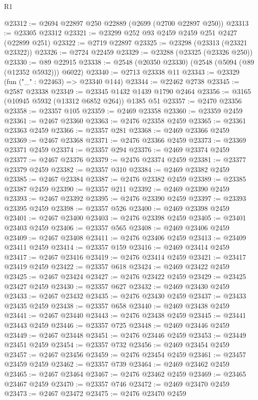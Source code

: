 \begin{lexlean}{R1}
\begin{coremodule}
@23312 := @2694 @22897 @250 @22889 (@2699 (@2700 @22897 @250))
@23313 := @23305 @23312
@23321 := @23299 @252 @93 @2459 @2459 @251 @2427 (@22899 @251)
@23322 := @2719 @22897
@23325 := @23298 (@23313 (@23321 @23322))
@23326 := @2724 @22459
@23329 := @23288 (@23325 (@23326 @250))
@23330 := @89 @22915
@23338 := @2548 (@20350 @23330) (@2548 (@5094 (@89 (@12352 @5932))) @6022)
@23340 := @2713 @23338 @11
@23343 := @23329 (fun ("_" : @22463) => @23340 @144)
@23344 := @22462 @2738
@23345 := @2587 @23338
@23349 := @23345 @1432 @1439 @1790 @2464
@23356 := @3165 (@10945 @5932 (@13312 @6852 @264)) @1385 @51
@23357 := @2470 @23356
@23358 := @23357 @105
@23359 := @2469 @23358
@23360 := @23359 @2459
@23361 := @2467 @23360
@23363 := @2476 @23358 @2459
@23365 := @23361 @23363 @2459
@23366 := @23357 @281
@23368 := @2469 @23366 @2459
@23369 := @2467 @23368
@23371 := @2476 @23366 @2459
@23373 := @23369 @23371 @2459
@23374 := @23357 @294
@23376 := @2469 @23374 @2459
@23377 := @2467 @23376
@23379 := @2476 @23374 @2459
@23381 := @23377 @23379 @2459
@23382 := @23357 @310
@23384 := @2469 @23382 @2459
@23385 := @2467 @23384
@23387 := @2476 @23382 @2459
@23389 := @23385 @23387 @2459
@23390 := @23357 @211
@23392 := @2469 @23390 @2459
@23393 := @2467 @23392
@23395 := @2476 @23390 @2459
@23397 := @23393 @23395 @2459
@23398 := @23357 @526
@23400 := @2469 @23398 @2459
@23401 := @2467 @23400
@23403 := @2476 @23398 @2459
@23405 := @23401 @23403 @2459
@23406 := @23357 @565
@23408 := @2469 @23406 @2459
@23409 := @2467 @23408
@23411 := @2476 @23406 @2459
@23413 := @23409 @23411 @2459
@23414 := @23357 @159
@23416 := @2469 @23414 @2459
@23417 := @2467 @23416
@23419 := @2476 @23414 @2459
@23421 := @23417 @23419 @2459
@23422 := @23357 @618
@23424 := @2469 @23422 @2459
@23425 := @2467 @23424
@23427 := @2476 @23422 @2459
@23429 := @23425 @23427 @2459
@23430 := @23357 @627
@23432 := @2469 @23430 @2459
@23433 := @2467 @23432
@23435 := @2476 @23430 @2459
@23437 := @23433 @23435 @2459
@23438 := @23357 @658
@23440 := @2469 @23438 @2459
@23441 := @2467 @23440
@23443 := @2476 @23438 @2459
@23445 := @23441 @23443 @2459
@23446 := @23357 @725
@23448 := @2469 @23446 @2459
@23449 := @2467 @23448
@23451 := @2476 @23446 @2459
@23453 := @23449 @23451 @2459
@23454 := @23357 @732
@23456 := @2469 @23454 @2459
@23457 := @2467 @23456
@23459 := @2476 @23454 @2459
@23461 := @23457 @23459 @2459
@23462 := @23357 @739
@23464 := @2469 @23462 @2459
@23465 := @2467 @23464
@23467 := @2476 @23462 @2459
@23469 := @23465 @23467 @2459
@23470 := @23357 @746
@23472 := @2469 @23470 @2459
@23473 := @2467 @23472
@23475 := @2476 @23470 @2459

\end{coremodule}
\end{lexlean}

